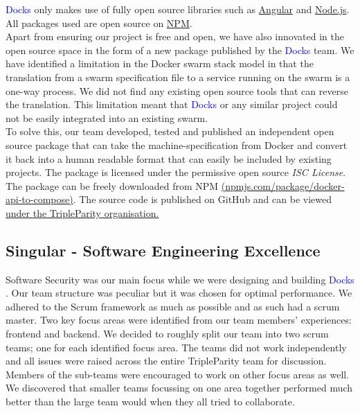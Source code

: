 \documentclass[]{article}
\newcommand{\docks}{\textcolor{Blue}{Docks} }
\newcommand{\docker}{Docker }
\begin{document}
\docks only makes use of fully open source libraries such as \href{https://github.com/angular}{Angular} and \href{https://github.com/nodejs}{Node.js}. All packages used are open source on \href{https://www.npmjs.com/}{NPM}. \\

Apart from ensuring our project is free and open, we have also innovated in the open source space in the form of a new package published by the \docks team. We have identified a limitation in the Docker swarm stack model in that the translation from a swarm specification file to a service running on the swarm is a one-way process. We did not find any existing open source tools that can reverse the translation. This limitation meant that \docks or any similar project could not be easily integrated into an existing swarm.\\
 
To solve this, our team developed, tested and published an independent open source package that can take the machine-specification from \docker and convert it back into a human readable format that can easily be included by existing projects. The package is licensed under the permissive open source \textit{ISC License}. The package can be freely downloaded from NPM \href{https://www.npmjs.com/package/docker-api-to-compose}{(npmjs.com/package/docker-api-to-compose)}. The source code is published on GitHub and can be viewed \href{https://github.com/TripleParity/docker-api-to-compose}{under the TripleParity organisation.}


\subsection{Singular - Software Engineering Excellence}
Software Security was our main focus while we were designing and building \docks.
Our team structure was peculiar but it was chosen for optimal performance. We adhered to the Scrum 
framework as much as possible and as such had a scrum master. Two key focus areas were identified from our team members' experiences: frontend and backend. We decided to roughly split our team into two scrum teams; one for each identified focus area. The teams did not work independently and all issues were raised across the entire TripleParity team for discussion. Members of the sub-teams were encouraged to work on other focus areas as well. We discovered that smaller teams focussing on one area together performed much better than the large team would when they all tried to collaborate. \\
\end{document}
